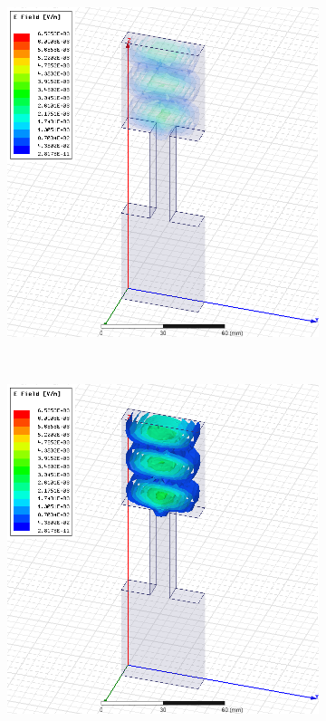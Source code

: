 \documentclass[12pt,a4paper]{article}
\begin{document}
\begin{figure}
\begin{subfigure}[b]{0.49\textwidth}
    \includegraphics[width=\textwidth]{./mid_sec_10mm_wide_50mm_long/7ghz.png}
    \label{fig:2_1050_7ghz}
  \end{subfigure}\\
  \begin{subfigure}[b]{0.49\textwidth}
    \includegraphics[width=\textwidth]{./mid_sec_10mm_wide_50mm_long/9ghz.png}

\end{subfigure}
\end{figure}
\end{document}
